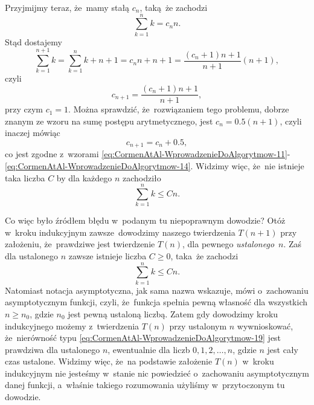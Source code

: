 \documentclass[a4paper,11pt]{article}
\begin{document}
Przyjmijmy teraz, że~mamy stałą $c_{ n }$, taką~że zachodzi
\begin{equation}
  \label{eq:CormenAtAl-WprowadzenieDoAlgorytmow-15}
  \sum_{ k = 1 }^{ n } k = c_{ n } n.
\end{equation}
Stąd dostajemy
\begin{equation}
  \label{eq:CormenAtAl-WprowadzenieDoAlgorytmow-16}
  \sum_{ k = 1 }^{ n + 1 } k = \sum_{ k = 1 }^{ n } k + n + 1 = c_{ n } n + n + 1 =
  \frac{ ( c_{ n } + 1 ) n + 1 }{ n + 1 } ( n + 1 ),
\end{equation}
czyli
\begin{equation}
  \label{eq:CormenAtAl-WprowadzenieDoAlgorytmow-17}
  c_{ n + 1 } = \frac{ ( c_{ n } + 1 ) n + 1 }{ n + 1 },
\end{equation}
przy czym $c_{ 1 } = 1$. Można sprawdzić, że~rozwiązaniem tego problemu,
dobrze znanym ze wzoru na sumę postępu arytmetycznego, jest
$c_{ n } = 0.5 ( n + 1 )$, czyli inaczej mówiąc
\begin{equation}
  \label{eq:CormenAtAl-WprowadzenieDoAlgorytmow-18}
  c_{ n + 1 } = c_{ n } + 0.5,
\end{equation}
co jest zgodne z~wzorami
\eqref{eq:CormenAtAl-WprowadzenieDoAlgorytmow-11}-\eqref{eq:CormenAtAl-WprowadzenieDoAlgorytmow-14}.
Widzimy więc, że~nie istnieje taka liczba $C$ by dla każdego $n$ zachodziło
\begin{equation}
  \label{eq:CormenAtAl-WprowadzenieDoAlgorytmow-19}
  \sum_{ k = 1 }^{ n } k \leq C n.
\end{equation}

Co więc było źródłem błędu w~podanym tu niepoprawnym dowodzie? Otóż w~kroku
indukcyjnym zawsze~dowodzimy naszego twierdzenia $T( n + 1 )$ przy
założeniu, że~prawdziwe jest twierdzenie $T( n )$, dla pewnego
\textit{ustalonego}~$n$. Zaś dla ustalonego $n$ zawsze istnieje liczba
$C \geq 0$, taka~że zachodzi
\begin{equation}
  \label{eq:CormenAtAl-WprowadzenieDoAlgorytmow-20}
  \sum_{ k = 1 }^{ n } k \leq C n.
\end{equation}
Natomiast notacja asymptotyczna, jak sama nazwa wskazuje, mówi o~zachowaniu
asymptotycznym funkcji, czyli, że~funkcja spełnia pewną własność dla
wszystkich $n \geq n_{ 0 }$, gdzie $n_{ 0 }$ jest pewną ustaloną liczbą. Zatem
gdy dowodzimy kroku indukcyjnego możemy z~twierdzenia $T( n )$ przy
ustalonym $n$ wywnioskować, że~nierówność typu
\eqref{eq:CormenAtAl-WprowadzenieDoAlgorytmow-19} jest prawdziwa dla
ustalonego $n$, ewentualnie dla liczb $0, 1, 2, \ldots, n$, gdzie $n$ jest
cały czas ustalone. Widzimy więc, że~na podstawie założenie $T( n )$
w~kroku indukcyjnym nie jesteśmy w~stanie nic powiedzieć o~zachowaniu
asymptotycznym danej funkcji, a~właśnie takiego rozumowania użyliśmy
w~przytoczonym tu dowodzie.
\end{document}
